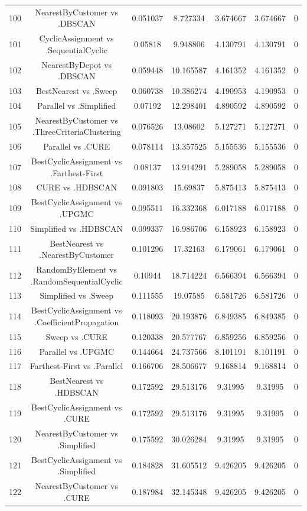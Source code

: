 \documentclass[a4paper,10pt]{article}
\begin{document}
\begin{landscape}
\begin{table}[!htp]
\begin{tabular}{ccccccc}
100&NearestByCustomer vs .DBSCAN&0.051037&8.727334&3.674667&3.674667&0\\
101&CyclicAssignment vs .SequentialCyclic&0.05818&9.948806&4.130791&4.130791&0\\
102&NearestByDepot vs .DBSCAN&0.059448&10.165587&4.161352&4.161352&0\\
103&BestNearest vs .Sweep&0.060738&10.386274&4.190953&4.190953&0\\
104&Parallel vs .Simplified&0.07192&12.298401&4.890592&4.890592&0\\
105&NearestByCustomer vs .ThreeCriteriaClustering&0.076526&13.08602&5.127271&5.127271&0\\
106&Parallel vs .CURE&0.078114&13.357525&5.155536&5.155536&0\\
107&BestCyclicAssignment vs .Farthest-First&0.08137&13.914291&5.289058&5.289058&0\\
108&CURE vs .HDBSCAN&0.091803&15.69837&5.875413&5.875413&0\\
109&BestCyclicAssignment vs .UPGMC&0.095511&16.332368&6.017188&6.017188&0\\
110&Simplified vs .HDBSCAN&0.099337&16.986706&6.158923&6.158923&0\\
111&BestNearest vs .NearestByCustomer&0.101296&17.32163&6.179061&6.179061&0\\
112&RandomByElement vs .RandomSequentialCyclic&0.10944&18.714224&6.566394&6.566394&0\\
113&Simplified vs .Sweep&0.111555&19.07585&6.581726&6.581726&0\\
114&BestCyclicAssignment vs .CoefficientPropagation&0.118093&20.193876&6.849385&6.849385&0\\
115&Sweep vs .CURE&0.120338&20.577767&6.859256&6.859256&0\\
116&Parallel vs .UPGMC&0.144664&24.737566&8.101191&8.101191&0\\
117&Farthest-First vs .Parallel&0.166706&28.506677&9.168814&9.168814&0\\
118&BestNearest vs .HDBSCAN&0.172592&29.513176&9.31995&9.31995&0\\
119&BestCyclicAssignment vs .CURE&0.172592&29.513176&9.31995&9.31995&0\\
120&NearestByCustomer vs .Simplified&0.175592&30.026284&9.31995&9.31995&0\\
121&BestCyclicAssignment vs .Simplified&0.184828&31.605512&9.426205&9.426205&0\\
122&NearestByCustomer vs .CURE&0.187984&32.145348&9.426205&9.426205&0\\

\end{tabular}
\end{table}
\end{landscape}
\end{document}
